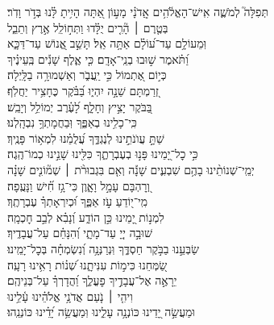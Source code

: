 \documentclass[twoside, openany, parskip=half, 11pt]{book}
\begin{document}
\begin{narrow}
תְּפִלָּה֮ לְמֹשֶׁ֢ה אִֽישׁ־הָאֱלֹ֫הִ֥ים \hfill \break
 אֲֽדֹנָ֗י \hfill מָע֣וֹן אַ֭תָּה הָיִ֥יתָ לָּ֗נוּ בְּדֹ֣ר וָדֹֽר׃ \\
 בְּטֶ֤רֶם ׀ הָ֘רִ֤ים יֻלָּ֗דוּ \hfill וַתְּח֣וֹלֵֽל אֶ֣רֶץ וְתֵבֵ֑ל \\ וּֽמֵעוֹלָ֥ם עַד־ע֝וֹלָ֗ם אַתָּ֥ה אֵֽל׃ \hfill
 תָּשֵׁ֣ב אֱ֭נוֹשׁ עַד־דַּכָּ֑א\\ וַ֝תֹּ֗אמֶר שׁ֣וּבוּ בְנֵֽי־אָדָֽם׃ \hfill
 כִּ֤י אֶ֪לֶף שָׁנִ֡ים בְּֽעֵינֶ֗יךָ \\ כְּי֣וֹם אֶ֭תְמוֹל כִּ֣י יַֽעֲבֹ֑ר \hfill וְאַשְׁמוּרָ֥ה בַלָּֽיְלָה׃ \\
 זְ֭רַמְתָּם שֵׁנָ֣ה יִהְי֑וּ \hfill בַּ֝בֹּ֗קֶר כֶּחָצִ֥יר יַחֲלֹֽף׃ \\
 בַּ֭בֹּקֶר יָצִ֣יץ וְחָלָ֑ף \hfill לָ֝עֶ֗רֶב יְמוֹלֵ֥ל וְיָבֵֽשׁ׃ \\
 כִּֽי־כָלִ֥ינוּ בְאַפֶּ֑ךָ \hfill וּֽבַחֲמָתְךָ֥ נִבְהָֽלְנוּ׃ \\
 שַׁתָּ֣ עֲוֺנֹתֵ֣ינוּ לְנֶגְדֶּ֑ךָ \hfill עֲ֝לֻמֵ֗נוּ לִמְא֥וֹר פָּנֶֽיךָ׃ \\
 כִּ֣י כׇל־יָ֭מֵינוּ פָּנ֣וּ בְעֶבְרָתֶ֑ךָ \hfill כִּלִּ֖ינוּ שָׁנֵ֣ינוּ כְמוֹ־הֶֽגֶה׃ \\
 יְמֵֽי־שְׁנוֹתֵ֨ינוּ בָהֶ֥ם שִׁבְעִ֪ים שָׁנָ֡ה \hfill וְאִ֤ם בִּגְבוּרֹ֨ת ׀ שְׁמ֘וֹנִ֤ים שָׁנָ֗ה\\ וְ֭רׇהְבָּם עָמָ֣ל וָאָ֑וֶן \hfill כִּי־גָ֥ז חִ֗֝ישׁ וַנָּעֻֽפָה׃ \\
מִֽי־י֭וֹדֵעַ עֹ֣ז אַפֶּ֑ךָ \hfill וּ֝כְיִרְאָתְךָ֗ עֶבְרָתֶֽךָ׃ \\
 לִמְנ֣וֹת יָ֭מֵינוּ כֵּ֣ן הוֹדַ֑ע \hfill וְ֝נָבִ֗א לְבַ֣ב חׇכְמָֽה׃ \\
 שׁוּבָ֣ה יְיָ֭ עַד־מָתָ֑י \hfill וְ֝הִנָּחֵ֗ם עַל־עֲבָדֶֽיךָ׃ \\
 שַׂבְּעֵ֣נוּ בַבֹּ֣קֶר חַסְדֶּ֑ךָ \hfill וּֽנְרַנְּנָ֥ה וְ֝נִשְׂמְחָ֗ה בְּכׇל־יָמֵֽינוּ׃ \\
 שַׂ֭מְּחֵנוּ כִּימ֣וֹת עִנִּיתָ֑נוּ \hfill שְׁ֝נ֗וֹת רָאִ֥ינוּ רָעָֽה׃ \\
 יֵרָאֶ֣ה אֶל־עֲבָדֶ֣יךָ פׇעֳלֶ֑ךָ \hfill וַ֝הֲדָרְךָ֗ עַל־בְּנֵיהֶֽם׃ \\
וִיהִ֤י ׀ נֹ֤עַם אֲדֹנָ֥י אֱלֹהֵ֗ינוּ \hfill עָ֫לֵ֥ינוּ \\ וּמַעֲשֵׂ֣ה יָ֭דֵינוּ כּוֹנְנָ֥ה עָלֵ֑ינוּ \hfill וּֽמַעֲשֵׂ֥ה יָ֝דֵ֗ינוּ כּוֹנְנֵֽהוּ׃ \\



\end{narrow}
\end{document}
